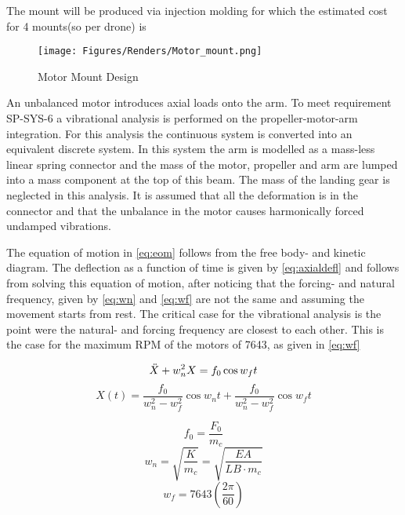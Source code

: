 The mount will be produced via injection molding for which the estimated cost for 4 mounts(so per drone) is 

\begin{figure}[H]
    \centering
    \texttt{[image: Figures/Renders/Motor\_mount.png]}
    \caption{Motor Mount Design}
    \label{fig:motormount}
\end{figure}

An unbalanced motor introduces axial loads onto the arm. To meet requirement SP-SYS-6 a vibrational analysis is performed on the propeller-motor-arm integration. For this analysis the continuous system is converted into an equivalent discrete system. In this system the arm is modelled as a mass-less linear spring connector and the mass of the motor, propeller and arm are lumped into a mass component at the top of this beam. The mass of the landing gear is neglected in this analysis. It is assumed that all the deformation is in the connector and that the unbalance in the motor causes harmonically forced undamped vibrations.

The equation of motion in \autoref{eq:eom} follows from the free body- and kinetic diagram. The deflection as a function of time is given by \autoref{eq:axialdefl}  and follows from solving this equation of motion, after noticing that the forcing- and natural frequency, given by \autoref{eq:wn} and \autoref{eq:wf} are not the same and assuming the movement starts from rest. The critical case for the vibrational analysis is the point were the natural- and forcing frequency are closest to each other. This is the case for the maximum RPM of the motors of 7643, as given in \autoref{eq:wf}

\begin{multicols}{2}\setlength{\columnseprule}{0pt}
\begin{equation}\label{eq:eom}
   \Ddot{X} + w_n^2 X = f_0 \cos{w_f t}
\end{equation}
\break
\begin{equation} \label{eq:axialdefl}
   X(t) = \frac{f_0}{w_n^2 - w_f^2}\cos{w_n t} + \frac{f_0}{w_n^2 - w_f^2}\cos{w_f t}
\end{equation}
\end{multicols}


\begin{multicols}{3}\setlength{\columnseprule}{0pt}
\begin{equation} \label{eq:f0}
   f_0 = \frac{F_0}{m_c}
\end{equation}
\break 
\begin{equation} \label{eq:wn}
    w_n = \sqrt{\frac{K}{m_c}} = \sqrt{\frac{E A}{LB \cdot m_c}}
\end{equation}
\break
\begin{equation} \label{eq:wf}
    w_f =  7643 \left(\frac{2\pi}{60}\right)
\end{equation}
\end{multicols}

